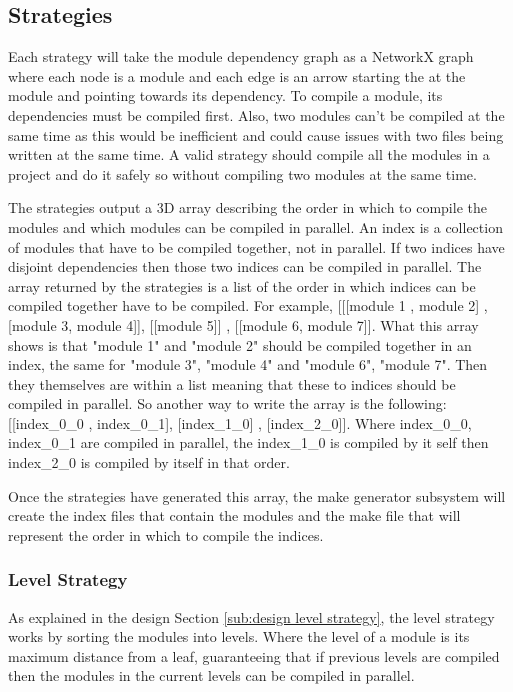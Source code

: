 \subsection{Strategies}

Each strategy will take the module dependency graph as a NetworkX graph where
each node is a module and each edge is an arrow starting the at the module and
pointing towards its dependency. To compile a module, its dependencies must be
compiled first. Also, two modules can't be compiled at the same time as this
would be inefficient and could cause issues with two files being written at the
same time. A valid strategy should compile all the modules in a project and do
it safely so without compiling two modules at the same time. 

The strategies output a 3D array describing the order in which to compile the
modules and which modules can be compiled in parallel. An index is a collection
of modules that have to be compiled together, not in parallel. If two indices
have disjoint dependencies then those two indices can be compiled in parallel.
The array returned by the strategies is a list of the order in which indices
can be compiled together have to be compiled. For example, [[[module 1 , module
2] , [module 3, module 4]], [[module 5]] , [[module 6, module 7]]. What this
array shows is that "module 1" and "module 2" should be compiled together in an
index, the same for "module 3", "module 4" and "module 6", "module 7". Then
they themselves are within a list meaning that these to indices should be
compiled in parallel. So another way to write the array is the following:
[[index\_0\_0 , index\_0\_1], [index\_1\_0] , [index\_2\_0]]. Where index\_0\_0,
index\_0\_1 are compiled in parallel, the index\_1\_0 is compiled by it self then
index\_2\_0 is compiled by itself in that order.

Once the strategies have generated this array, the make generator
subsystem will create the index files that contain the modules and the make
file that will represent the order in which to compile the indices.

\subsubsection{Level Strategy} \label{sub:imp lvl strategy}

As explained in the design Section \ref{sub:design level strategy}, the level
strategy works by sorting the modules into levels. Where the level of a module
is its maximum distance from a leaf, guaranteeing that if previous levels are
compiled then the modules in the current levels can be compiled in parallel.

